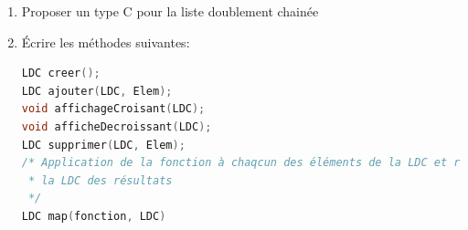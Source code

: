 \begin{enumerate}
	\item Proposer un type C pour la liste doublement chainée
	\item \'Ecrire les méthodes suivantes:  \\
\begin{lstlisting}[language=C, numbers=none]
LDC creer();
LDC ajouter(LDC, Elem);
void affichageCroisant(LDC);
void afficheDecroissant(LDC);
LDC supprimer(LDC, Elem);
/* Application de la fonction à chaqcun des éléments de la LDC et renvoie
 * la LDC des résultats 
 */
LDC map(fonction, LDC) 
\end{lstlisting}
\end{enumerate}



